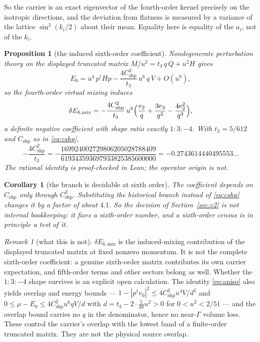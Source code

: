 \documentclass[11pt]{article}
\newtheorem{proposition}[theorem]{Proposition}
\newtheorem{corollary}[theorem]{Corollary}
\theoremstyle{definition}
\theoremstyle{remark}
\newtheorem{remark}[theorem]{Remark}
\newcommand{\dg}{^{\dagger}}
\newcommand{\chk}[1]{}
\begin{document}
So the carrier is an exact eigenvector of the fourth-order kernel precisely on
the isotropic directions, and the deviation from flatness is measured by a
variance of the lattice $\sin^2(k_i/2)$ about their mean. Equality here is
equality of the $a_i$, not of the $k_i$.

\begin{proposition}[the induced sixth-order coefficient]\label{prop:sixth}
Nondegenerate perturbation theory on the displayed truncated matrix
$M/u^2=t_3\,q\,Q+u^2H$ gives
\[
  E_0=u^4\,p\dg H p-\frac{4C_{\mathrm{shp}}^2}{t_3}\,u^6\,q\,V+O(u^8),
\]
so the fourth-order virtual mixing induces
\[
  \delta E_{6,\mathrm{mix}}
  =-\frac{4C_{\mathrm{shp}}^2}{t_3}\,u^6
    \Bigl(\frac{e_2}{q}+\frac{3e_3}{q^2}-\frac{4e_2^2}{q^3}\Bigr),
\]
a definite negative coefficient with shape ratio exactly $1:3:-4$. With
$t_3=5/612$ and $C_{\mathrm{shp}}$ as in \eqref{eq:cshp},
\[
  -\frac{4C_{\mathrm{shp}}^2}{t_3}
  =-\frac{169924002729806205028788409}{619343593697933825385600000}
  =-0.2743614440495553\ldots
\]
The rational identity is proof-checked in Lean; the operator origin is
not.\chk{anisotropy induced sixth-order coefficient is minus four C squared over t3}
\end{proposition}

\begin{corollary}[the branch is decidable at sixth order]\label{cor:branch}
The coefficient depends on $C_{\mathrm{shp}}$ only through $C_{\mathrm{shp}}^2$.
Substituting the historical branch instead of \eqref{eq:cshp} changes it by a
factor of about $4.1$. So the decision of Section~\ref{sec:c2} is not internal
bookkeeping: it fixes a sixth-order number, and a sixth-order census is in
principle a test of it.
\end{corollary}

\begin{remark}[what this is not]
$\delta E_{6,\mathrm{mix}}$ is the induced-mixing contribution of the displayed
truncated matrix at fixed nonzero momentum. It is not the complete sixth-order
coefficient: a genuine sixth-order matrix contributes its own carrier
expectation, and fifth-order terms and other sectors belong as well. Whether
the $1:3:-4$ shape survives is an explicit open calculation. The identity
\eqref{eq:aniso} also yields overlap and energy bounds ---
$1-|p\dg v_0|^2\le 4C_{\mathrm{shp}}^2u^4V/d^2$ and
$0\le\mu-E_0\le4C_{\mathrm{shp}}^2u^6qV/d$ with $d=t_3-2\cdot\tfrac{5}{48}u^2>0$
for $0<u^2<2/51$ --- and the overlap bound carries no $q$ in the denominator,
hence no near-$\Gamma$ volume loss. These control the carrier's overlap with
the lowest band of a finite-order truncated matrix. They are not the physical
source overlap.
\end{remark}
\end{document}

